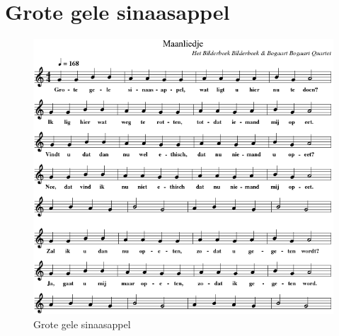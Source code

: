\section{Grote gele sinaasappel}



\begin{figure}[!htbp]
  \includegraphics[width=\textwidth,height=\textheight,keepaspectratio]{../songs/02_grote_gele_sinaasappel.png}
  \caption{Grote gele sinaasappel}
  \label{fig:02_grote_gele_sinaasappel}
\end{figure}
